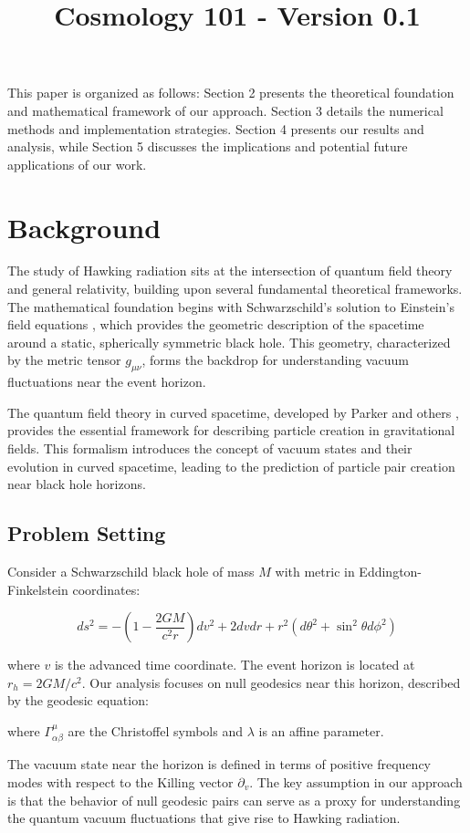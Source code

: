 \documentclass{article}\usepackage{graphicx} \usepackage{amsmath} \usepackage{colortbl}\title{Cosmology 101 - Version 0.1}
\begin{document}
This paper is organized as follows: Section 2 presents the theoretical foundation and mathematical framework of our approach. Section 3 details the numerical methods and implementation strategies. Section 4 presents our results and analysis, while Section 5 discusses the implications and potential future applications of our work.\section{Background}

The study of Hawking radiation sits at the intersection of quantum field theory and general relativity, building upon several fundamental theoretical frameworks. The mathematical foundation begins with Schwarzschild's solution to Einstein's field equations \cite{hawking1975}, which provides the geometric description of the spacetime around a static, spherically symmetric black hole. This geometry, characterized by the metric tensor $g_{\mu\nu}$, forms the backdrop for understanding vacuum fluctuations near the event horizon.

The quantum field theory in curved spacetime, developed by Parker and others \cite{birrell1984}, provides the essential framework for describing particle creation in gravitational fields. This formalism introduces the concept of vacuum states and their evolution in curved spacetime, leading to the prediction of particle pair creation near black hole horizons.

\subsection{Problem Setting}
Consider a Schwarzschild black hole of mass $M$ with metric in Eddington-Finkelstein coordinates:

\begin{equation}
ds^2 = -\left(1-\frac{2GM}{c^2r}\right)dv^2 + 2dvdr + r^2(d\theta^2 + \sin^2\theta d\phi^2)
\end{equation}

where $v$ is the advanced time coordinate. The event horizon is located at $r_h = 2GM/c^2$. Our analysis focuses on null geodesics near this horizon, described by the geodesic equation:


where $\Gamma^{\mu}_{\alpha\beta}$ are the Christoffel symbols and $\lambda$ is an affine parameter.

The vacuum state near the horizon is defined in terms of positive frequency modes with respect to the Killing vector $\partial_v$. The key assumption in our approach is that the behavior of null geodesic pairs can serve as a proxy for understanding the quantum vacuum fluctuations that give rise to Hawking radiation.
\end{document}
